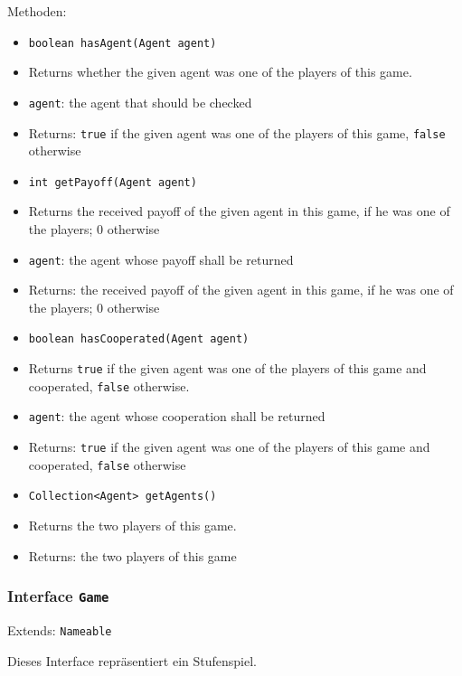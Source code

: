 \documentclass[parskip=full,11pt]{scrartcl}
\begin{document}
Methoden:
\begin{itemize}\itemsep -10pt
\item  \texttt{boolean hasAgent(Agent agent)}
\item[] Returns whether the given agent was one of the players of this game.
\item[] \texttt{agent}: the agent that should be checked
\item[] Returns: \texttt{true} if the given agent was one of the players of this game, \texttt{false} otherwise

\item \texttt{int getPayoff(Agent agent)}
\item[] Returns the received payoff of the given agent in this game, if he was one of the players; \(0\) otherwise
\item[] \texttt{agent}: the agent whose payoff shall be returned
\item[] Returns: the received payoff of the given agent in this game, if he was one of the players; \(0\) otherwise

\item \texttt{boolean hasCooperated(Agent agent)}
\item[] Returns \texttt{true} if the given agent was one of the players of this game and cooperated, \texttt{false} otherwise.
\item[] \texttt{agent}: the agent whose cooperation shall be returned
\item[] Returns: \texttt{true} if the given agent was one of the players of this game and cooperated, \texttt{false} otherwise

\item \texttt{Collection<Agent> getAgents()}
\item[] Returns the two players of this game.
\item[] Returns: the two players of this game
\end{itemize}

\subsubsection{Interface \texttt{Game}}
Extends: \texttt{Nameable}

Dieses Interface repräsentiert ein Stufenspiel.
\end{document}
